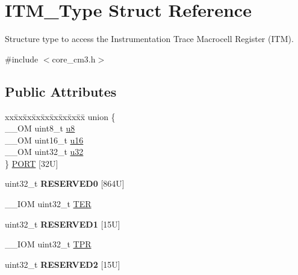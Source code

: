 \hypertarget{struct_i_t_m___type}{\section{I\-T\-M\-\_\-\-Type Struct Reference}
\label{struct_i_t_m___type}
}


Structure type to access the Instrumentation Trace Macrocell Register (I\-T\-M).  




{\ttfamily \#include $<$core\-\_\-cm3.\-h$>$}

\subsection*{Public Attributes}
\begin{DoxyCompactItemize}
\item 
\begin{tabbing}
xx\=xx\=xx\=xx\=xx\=xx\=xx\=xx\=xx\=\kill
union \{\\
\>\_\_OM uint8\_t \hyperlink{struct_i_t_m___type_ae773bf9f9dac64e6c28b14aa39f74275}{u8}\\
\>\_\_OM uint16\_t \hyperlink{struct_i_t_m___type_a962a970dfd286cad7f8a8577e87d4ad3}{u16}\\
\>\_\_OM uint32\_t \hyperlink{struct_i_t_m___type_a5834885903a557674f078f3b71fa8bc8}{u32}\\
\} \hyperlink{struct_i_t_m___type_ad14bee8adf4bcc5807610d664432350e}{PORT} \mbox{[}32U\mbox{]}\\

\end{tabbing}\item 
\hypertarget{struct_i_t_m___type_ad50da09e70f739596fe3f2d9ea33f414}{uint32\-\_\-t {\bfseries R\-E\-S\-E\-R\-V\-E\-D0} \mbox{[}864\-U\mbox{]}}\label{struct_i_t_m___type_ad50da09e70f739596fe3f2d9ea33f414}

\item 
\-\_\-\-\_\-\-I\-O\-M uint32\-\_\-t \hyperlink{struct_i_t_m___type_acd03c6858f7b678dab6a6121462e7807}{T\-E\-R}
\item 
\hypertarget{struct_i_t_m___type_ae4d156d0fc83519f984c1388e232aeab}{uint32\-\_\-t {\bfseries R\-E\-S\-E\-R\-V\-E\-D1} \mbox{[}15\-U\mbox{]}}\label{struct_i_t_m___type_ae4d156d0fc83519f984c1388e232aeab}

\item 
\-\_\-\-\_\-\-I\-O\-M uint32\-\_\-t \hyperlink{struct_i_t_m___type_ae907229ba50538bf370fbdfd54c099a2}{T\-P\-R}
\item 
\hypertarget{struct_i_t_m___type_a9ad73d87a673a206268958c84949ad15}{uint32\-\_\-t {\bfseries R\-E\-S\-E\-R\-V\-E\-D2} \mbox{[}15\-U\mbox{]}}\label{struct_i_t_m___type_a9ad73d87a673a206268958c84949ad15}


\end{DoxyCompactItemize}
